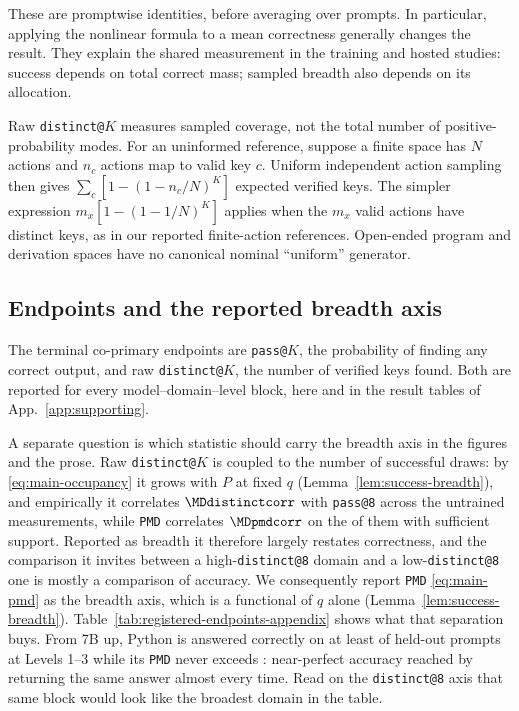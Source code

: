 \documentclass{article}
\newcommand{\1}{\mathbf 1}
\newcommand{\pmd}{\texttt{PMD}}
\theoremstyle{remark}
\theoremstyle{definition}
\theoremstyle{plain}
\begin{document}
These are promptwise identities, before averaging over prompts. In particular,
applying the nonlinear formula to a mean correctness generally changes the
result. They explain the shared measurement in the training and hosted
studies: success depends on total correct mass; sampled breadth also depends
on its allocation.

Raw \texttt{distinct@}$K$ measures sampled coverage, not the total number of
positive-probability modes. For an uninformed reference, suppose a finite
space has $N$ actions and $n_c$ actions map to valid key $c$. Uniform independent
action sampling then gives $\sum_c[1-(1-n_c/N)^K]$ expected verified keys.
The simpler expression $m_x[1-(1-1/N)^K]$ applies when the $m_x$ valid actions
have distinct keys, as in our reported finite-action references.
Open-ended program and derivation spaces have no canonical nominal
``uniform'' generator.

\subsection{Endpoints and the reported breadth axis}
\label{app:registered-endpoints}

The terminal co-primary endpoints are \texttt{pass@}$K$, the probability of
finding any correct output, and raw \texttt{distinct@}$K$, the number of
verified keys found. Both are reported for every model--domain--level block,
here and in the result tables of App.~\ref{app:supporting}.

A separate question is which statistic should carry the breadth axis in the
figures and the prose. Raw \texttt{distinct@}$K$ is coupled to the number of successful
draws: by \eqref{eq:main-occupancy} it grows with $P$ at fixed $q$
(Lemma~\ref{lem:success-breadth}), and
empirically it correlates $\MDdistinctcorr$ with \texttt{pass@8} across the
\MDcells{} untrained measurements, while \pmd{} correlates $\MDpmdcorr$ on the
\MDreportable{} of them with sufficient support.
Reported as breadth it therefore largely restates correctness, and the
comparison it invites between a high-\texttt{distinct@8} domain and a
low-\texttt{distinct@8} one is mostly a comparison of accuracy. We consequently
report \pmd{} \eqref{eq:main-pmd} as the breadth axis, which is a functional of
$q$ alone (Lemma~\ref{lem:success-breadth}).
Table~\ref{tab:registered-endpoints-appendix} shows what that separation buys.
From 7B up, Python is answered correctly on at least \MDpyPasslo{} of held-out
prompts at Levels 1--3 while its \pmd{} never exceeds \MDpyPmdhi{}:
near-perfect accuracy reached by returning the same answer almost every time.
Read on the \texttt{distinct@8} axis that same block would look like the
broadest domain in the table.
\end{document}
